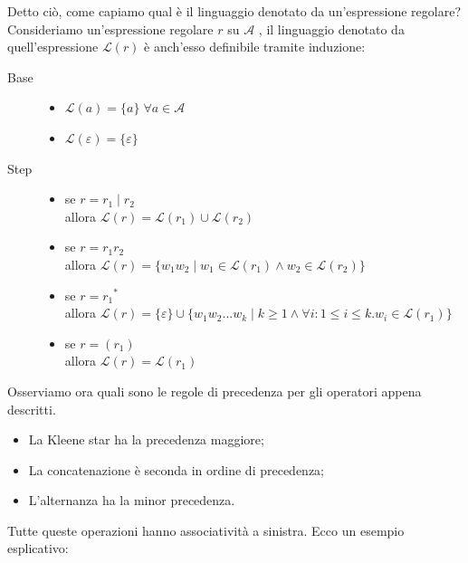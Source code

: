 \documentclass[class=book, crop=false, oneside, 12pt]{standalone}
\begin{document}
Detto ciò, come capiamo qual è il linguaggio denotato da un’espressione regolare?
Consideriamo un’espressione regolare \(r\) su \(\mathcal{A}\) , il linguaggio denotato da quell'espressione \(\mathcal{L}(r)\) è anch'esso definibile tramite induzione:
\begin{description}
    \item[Base] \begin{itemize}
                    \item \(\mathcal{L}(a) = \{a\} \; \forall a \in \mathcal{A}\)
                    \item \(\mathcal{L}(\varepsilon) = \{\varepsilon\}\)
                \end{itemize}
    \item[Step] \begin{itemize}
                    \item se \(r = r_1 \mid r_2 \) \\
                    allora \(\mathcal{L}(r)= \mathcal{L}(r_1) \cup \mathcal{L}(r_2)\)
                    \item se \(r=r_1 r_2\) \\
                    allora \(\mathcal{L}(r) = \{w_1 w_2 \mid w_1 \in \mathcal{L}(r_1) \land w_2 \in \mathcal{L}(r_2)\}\)
                    \item se \(r = r_1\)\(^\ast\) \\
                    allora \( \mathcal{L}(r) = \{ \varepsilon \} \cup \{ w_1 w_2 ... w_k \mid k \ge 1 \land \forall i : 1 \le i \le k.w_i \in \mathcal{L}(r_1)\} \)
                    \item se \(r=(r_1)\) \\allora \( \mathcal{L}(r) = \mathcal{L}(r_1)\)
                \end{itemize}
\end{description}

\noindent Osserviamo ora quali sono le regole di precedenza per gli operatori appena descritti.

\begin{itemize}
    \item La Kleene star ha la precedenza maggiore;
    \item La concatenazione è seconda in ordine di precedenza;
    \item L'alternanza ha la minor precedenza.
\end{itemize}

\noindent Tutte queste operazioni hanno associatività a sinistra.
Ecco un esempio esplicativo:
\end{document}
